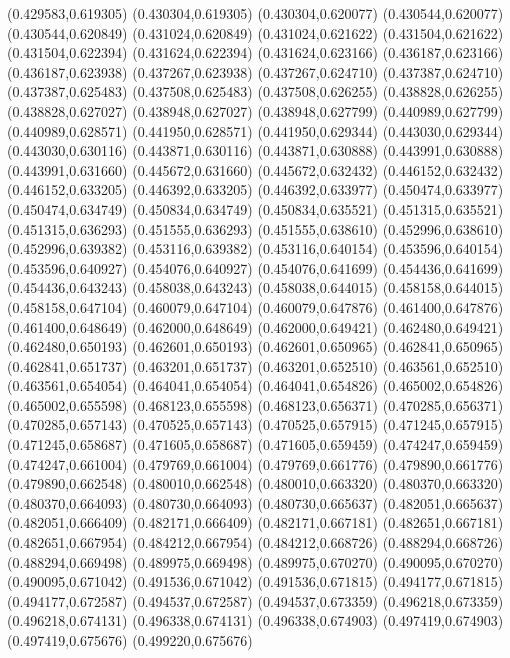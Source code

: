 (0.429583,0.619305)
(0.430304,0.619305)
(0.430304,0.620077)
(0.430544,0.620077)
(0.430544,0.620849)
(0.431024,0.620849)
(0.431024,0.621622)
(0.431504,0.621622)
(0.431504,0.622394)
(0.431624,0.622394)
(0.431624,0.623166)
(0.436187,0.623166)
(0.436187,0.623938)
(0.437267,0.623938)
(0.437267,0.624710)
(0.437387,0.624710)
(0.437387,0.625483)
(0.437508,0.625483)
(0.437508,0.626255)
(0.438828,0.626255)
(0.438828,0.627027)
(0.438948,0.627027)
(0.438948,0.627799)
(0.440989,0.627799)
(0.440989,0.628571)
(0.441950,0.628571)
(0.441950,0.629344)
(0.443030,0.629344)
(0.443030,0.630116)
(0.443871,0.630116)
(0.443871,0.630888)
(0.443991,0.630888)
(0.443991,0.631660)
(0.445672,0.631660)
(0.445672,0.632432)
(0.446152,0.632432)
(0.446152,0.633205)
(0.446392,0.633205)
(0.446392,0.633977)
(0.450474,0.633977)
(0.450474,0.634749)
(0.450834,0.634749)
(0.450834,0.635521)
(0.451315,0.635521)
(0.451315,0.636293)
(0.451555,0.636293)
(0.451555,0.638610)
(0.452996,0.638610)
(0.452996,0.639382)
(0.453116,0.639382)
(0.453116,0.640154)
(0.453596,0.640154)
(0.453596,0.640927)
(0.454076,0.640927)
(0.454076,0.641699)
(0.454436,0.641699)
(0.454436,0.643243)
(0.458038,0.643243)
(0.458038,0.644015)
(0.458158,0.644015)
(0.458158,0.647104)
(0.460079,0.647104)
(0.460079,0.647876)
(0.461400,0.647876)
(0.461400,0.648649)
(0.462000,0.648649)
(0.462000,0.649421)
(0.462480,0.649421)
(0.462480,0.650193)
(0.462601,0.650193)
(0.462601,0.650965)
(0.462841,0.650965)
(0.462841,0.651737)
(0.463201,0.651737)
(0.463201,0.652510)
(0.463561,0.652510)
(0.463561,0.654054)
(0.464041,0.654054)
(0.464041,0.654826)
(0.465002,0.654826)
(0.465002,0.655598)
(0.468123,0.655598)
(0.468123,0.656371)
(0.470285,0.656371)
(0.470285,0.657143)
(0.470525,0.657143)
(0.470525,0.657915)
(0.471245,0.657915)
(0.471245,0.658687)
(0.471605,0.658687)
(0.471605,0.659459)
(0.474247,0.659459)
(0.474247,0.661004)
(0.479769,0.661004)
(0.479769,0.661776)
(0.479890,0.661776)
(0.479890,0.662548)
(0.480010,0.662548)
(0.480010,0.663320)
(0.480370,0.663320)
(0.480370,0.664093)
(0.480730,0.664093)
(0.480730,0.665637)
(0.482051,0.665637)
(0.482051,0.666409)
(0.482171,0.666409)
(0.482171,0.667181)
(0.482651,0.667181)
(0.482651,0.667954)
(0.484212,0.667954)
(0.484212,0.668726)
(0.488294,0.668726)
(0.488294,0.669498)
(0.489975,0.669498)
(0.489975,0.670270)
(0.490095,0.670270)
(0.490095,0.671042)
(0.491536,0.671042)
(0.491536,0.671815)
(0.494177,0.671815)
(0.494177,0.672587)
(0.494537,0.672587)
(0.494537,0.673359)
(0.496218,0.673359)
(0.496218,0.674131)
(0.496338,0.674131)
(0.496338,0.674903)
(0.497419,0.674903)
(0.497419,0.675676)
(0.499220,0.675676)
